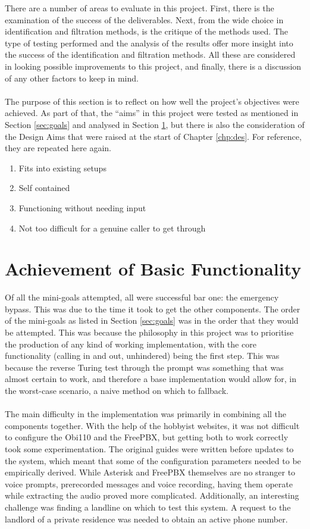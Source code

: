 \documentclass[main.tex]{subfiles}
\begin{document}
There are a number of areas to evaluate in this project. First, there is the examination of the success of the deliverables. Next, from the wide choice in identification and filtration methods, is the critique of the methods used. The type of testing performed and the analysis of the results offer more insight into the success of the identification and filtration methods. All these are considered in looking possible improvements to this project, and finally, there is a discussion of any other factors to keep in mind.
\\\\
The purpose of this section is to reflect on how well the project's objectives were achieved. As part of that, the ``aims'' in this project were tested as mentioned in Section \ref{sec:goals} and analysed in Section \ref{sec:eval-basic}, but there is also the consideration of the Design Aims that were raised at the start of Chapter \ref{chp:des}. For reference, they are repeated here again.

\begin{enumerate}
	\item Fits into existing setups
	\item Self contained
	\item Functioning without needing input
	\item Not too difficult for a genuine caller to get through
\end{enumerate}

\section{Achievement of Basic Functionality}\label{sec:eval-basic}
Of all the mini-goals attempted, all were successful bar one: the emergency bypass. This was due to the time it took to get the other components. The order of the mini-goals as listed in Section \ref{sec:goals} was in the order that they would be attempted. This was because the philosophy in this project was to prioritise the production of any kind of working implementation, with the core functionality (calling in and out, unhindered) being the first step. This was because the reverse Turing test through the prompt was something that was almost certain to work, and therefore a base implementation would allow for, in the worst-case scenario, a naive method on which to fallback.
\\\\
The main difficulty in the implementation was primarily in combining all the components together. With the help of the hobbyist websites, it was not difficult to configure the Obi110 and the FreePBX, but getting both to work correctly took some experimentation. The original guides were written before updates to the system, which meant that some of the configuration parameters needed to be empirically derived. While Asterisk and FreePBX themselves are no stranger to voice prompts, prerecorded messages and voice recording, having them operate while extracting the audio proved more complicated. Additionally, an interesting challenge was finding a landline on which to test this system. A request to the landlord of a private residence was needed to obtain an active phone number.
\end{document}
